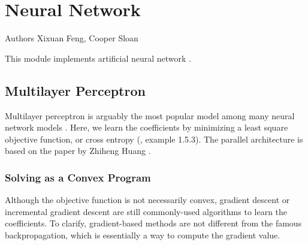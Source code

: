 



\chapter{Neural Network}

\begin{moduleinfo}
\item[Authors] {Xixuan Feng, Cooper Sloan}
\end{moduleinfo}

This module implements artificial neural network \cite{ann_wiki}.

\section{Multilayer Perceptron}
Multilayer perceptron is arguably the most popular model among many neural network models \cite{mlp_wiki}.
Here, we learn the coefficients by minimizing a least square objective function, or cross entropy (\cite{bertsekas1999nonlinear}, example 1.5.3).
The parallel architecture is based on the paper by Zhiheng Huang \cite{mlp_parallel}.

\subsection{Solving as a Convex Program}
Although the objective function is not necessarily convex, gradient descent or incremental gradient descent are still commonly-used algorithms to learn the coefficients.
To clarify, gradient-based methods are not different from the famous backpropagation, which is essentially a way to compute the gradient value.

